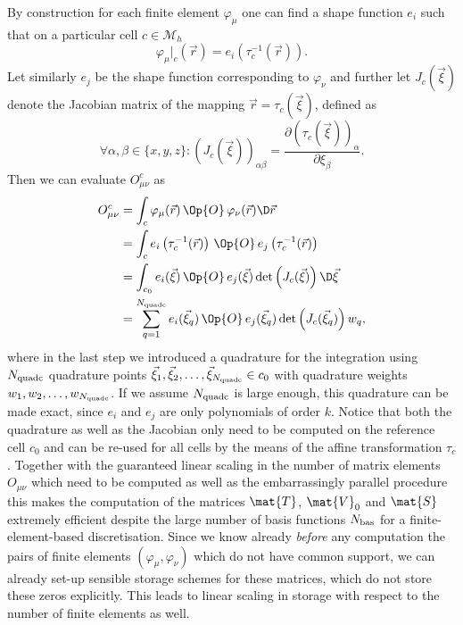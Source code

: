 By construction for each finite element
$\varphi_\mu$ one can find a shape function $e_i$
such that on a particular cell $c \in \mathcal{M}_h$
\[
	\varphi_\mu\big|_c(\vec{r}) = e_i\left( \tau_c^{-1}(\vec{r}) \right).
\]
Let similarly $e_j$ be the shape function corresponding to $\varphi_\nu$
and further let $J_c(\vec{\xi})$ denote the Jacobian matrix
of the mapping $\vec{r} = \tau_c(\vec{\xi})$,
defined as
\[
	\forall \alpha,\beta \in \{x,y,z\}:
	\left( J_c (\vec{\xi}) \right)_{\alpha\beta} = \frac{\partial \left( \tau_c(\vec{\xi})  \right)_\alpha}{\partial \xi_\beta}.
\]
Then we can evaluate $O^c_{\mu\nu}$ as
\begin{align*}
	O^c_{\mu\nu} &= \int_c \varphi_\mu(\vec{r})\, \Op{O} \, \varphi_\nu(\vec{r}) \D\vec{r} \\
	&= \int_c e_i\left( \tau_c^{-1}(\vec{r}) \right) \, \Op{O} \,
		e_j\left( \tau_c^{-1}(\vec{r}) \right) \\
		&= \int_{c_0} e_i(\vec{\xi}) \, \Op{O} \, e_j(\vec{\xi}) \det\left( J_c(\vec{\xi}) \right) \D \vec{\xi} \\
	&= \sum_{q=1}^{\Nquadc} e_i(\vec{\xi}_q) \, \Op{O} \, e_j(\vec{\xi}_q) \det\left( J_c(\vec{\xi}_q) \right) w_q,
\end{align*}
where in the last step we introduced a quadrature for the integration
using $N_\text{quadc}$ quadrature points
$\vec{\xi}_1, \vec{\xi}_2, \ldots, \vec{\xi}_{N_\text{quadc}} \in c_0$
with quadrature weights $w_1, w_2, \ldots, w_{N_\text{quadc}}$.
If we assume $N_\text{quadc}$ is large enough,
this quadrature can be made exact,
since $e_i$ and $e_j$ are only polynomials of order $k$.
Notice that both the quadrature as well as the Jacobian
only need to be computed on the reference cell $c_0$
and can be re-used for all cells by the means of the affine transformation $\tau_c$.
Together with the guaranteed linear scaling
in the number of matrix elements $O_{\mu\nu}$
which need to be computed
as well as the embarrassingly parallel procedure
this makes the computation of the matrices $\mat{T}$,
$\mat{V}_0$ and $\mat{S}$ extremely efficient despite
the large number of basis functions $N_\text{bas}$ for a
finite-element-based discretisation.
Since we know already \emph{before} any computation
the pairs of finite elements $(\varphi_\mu, \varphi_\nu)$
which do not have common support,
we can already set-up sensible storage schemes
for these matrices,
which do not store these zeros explicitly.
This leads to linear scaling in storage with respect to the number
of finite elements as well.

